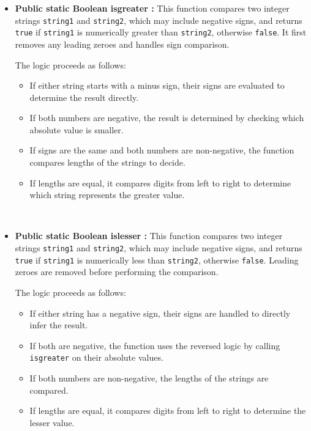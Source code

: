 \documentclass{article}
\begin{document}
\begin{itemize}
    At each step:
    \begin{itemize}
        \item Digits from both strings are subtracted, considering any existing borrow.
        \item If the digit in \texttt{string1} is smaller than the corresponding digit in \texttt{string2} plus the borrow, it borrows from the next higher digit.
        \item If \texttt{string2} is exhausted, only the digits of \texttt{string1} and borrow are processed.
    \item The resulting digit is prepended to the result string.
    \end{itemize}\\

    \item \textbf{Public static Boolean isgreater :} This function compares two integer strings \texttt{string1} and \texttt{string2}, which may include negative signs, and returns \texttt{true} if \texttt{string1} is numerically greater than \texttt{string2}, otherwise \texttt{false}. It first removes any leading zeroes and handles sign comparison.

The logic proceeds as follows:
\begin{itemize}
    \item If either string starts with a minus sign, their signs are evaluated to determine the result directly.
    \item If both numbers are negative, the result is determined by checking which absolute value is smaller.
    \item If signs are the same and both numbers are non-negative, the function compares lengths of the strings to decide.
    \item If lengths are equal, it compares digits from left to right to determine which string represents the greater value.
\end{itemize}\\

\item \textbf{Public static Boolean islesser :} This function compares two integer strings \texttt{string1} and \texttt{string2}, which may include negative signs, and returns \texttt{true} if \texttt{string1} is numerically less than \texttt{string2}, otherwise \texttt{false}. Leading zeroes are removed before performing the comparison.

The logic proceeds as follows:
\begin{itemize}
    \item If either string has a negative sign, their signs are handled to directly infer the result.
    \item If both are negative, the function uses the reversed logic by calling \texttt{isgreater} on their absolute values.
    \item If both numbers are non-negative, the lengths of the strings are compared.
    \item If lengths are equal, it compares digits from left to right to determine the lesser value.
\end{itemize}\\


\end{itemize}
\end{document}
